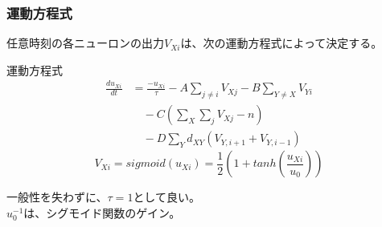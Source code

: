 \documentclass[dvipdfmx,11pt,notheorems]{beamer}
\theoremstyle{definition}
\begin{document}
\begin{frame}\frametitle{運動方程式}
任意時刻の各ニューロンの出力$V_{Xi}$は、次の運動方程式によって決定する。
\begin{block}{運動方程式}
\begin{equation}
\begin{split}
	\displaystyle \frac{du_{Xi}}{dt} &= \frac{-u_{Xi}}{\tau} - A\sum_{j \neq i}V_{Xj} - B\sum_{Y \neq X}V_{Yi} \\
    & \quad -C(\sum_{X}\sum_{j}V_{Xj} - n) \\
    & \quad -D\sum_{Y}d_{XY}(V_{Y, i+1} + V_{Y, i-1})
\end{split}
\end{equation}
\begin{equation}
	V_{Xi} = sigmoid(u_{Xi}) = \displaystyle \frac{1}{2}(1 + tanh(\frac{u_{Xi}}{u_{0}}))
\end{equation}
\end{block}
一般性を失わずに、$\tau = 1$として良い。 \\
$u_{0}^{-1}$は、シグモイド関数のゲイン。
\end{frame}
\end{document}
